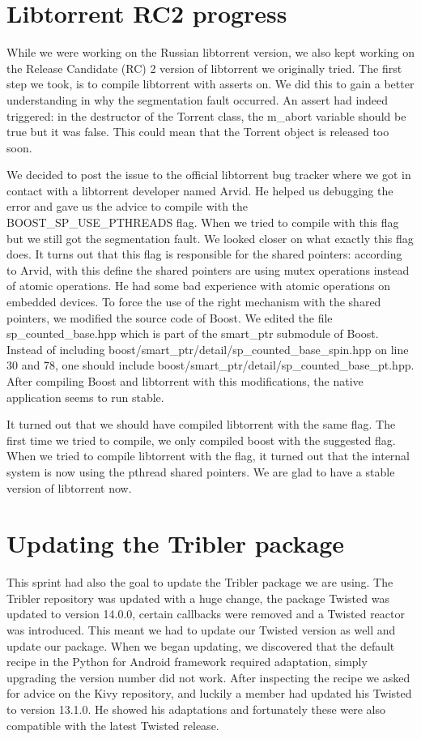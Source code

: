	\section{Libtorrent RC2 progress}
		While we were working on the Russian libtorrent version, we also kept working on the Release Candidate (RC) 2 version of libtorrent we originally tried. The first step we took, is to compile libtorrent with asserts on. We did this to gain a better understanding in why the segmentation fault occurred. An assert had indeed triggered: in the destructor of the Torrent class, the m\_abort variable should be true but it was false. This could mean that the Torrent object is released too soon.
		
		We decided to post the issue to the official libtorrent bug tracker where we got in contact with a libtorrent developer named Arvid. He helped us debugging the error and gave us the advice to compile with the BOOST\_SP\_USE\_PTHREADS flag. When we tried to compile with this flag but we still got the segmentation fault. We looked closer on what exactly this flag does. It turns out that this flag is responsible for the shared pointers: according to Arvid, with this define the shared pointers are using mutex operations instead of atomic operations. He had some bad experience with atomic operations on embedded devices. To force the use of the right mechanism with the shared pointers, we modified the source code of Boost. We edited the file sp\_counted\_base.hpp which is part of the smart\_ptr submodule of Boost. Instead of including boost/smart\_ptr/detail/sp\_counted\_base\_spin.hpp on line 30 and 78, one should include boost/smart\_ptr/detail/sp\_counted\_base\_pt.hpp. After compiling Boost and libtorrent with this modifications, the native application seems to run stable.
		
		It turned out that we should have compiled libtorrent with the same flag. The first time we tried to compile, we only compiled boost with the suggested flag. When we tried to compile libtorrent with the flag, it turned out that the internal system is now using the pthread shared pointers. We are glad to have a stable version of libtorrent now.
				
	\section{Updating the Tribler package}
		This sprint had also the goal to update the Tribler package we are using. The Tribler repository was updated with a huge change, the package Twisted was updated to version 14.0.0, certain callbacks were removed and a Twisted reactor was introduced. This meant we had to update our Twisted version as well and update our package.
		When we began updating, we discovered that the default recipe in the Python for Android framework required adaptation, simply upgrading the version number did not work. After inspecting the recipe we asked for advice on the Kivy repository, and luckily a member had updated his Twisted to version 13.1.0. He showed his adaptations and fortunately these were also compatible with the latest Twisted release.
		
